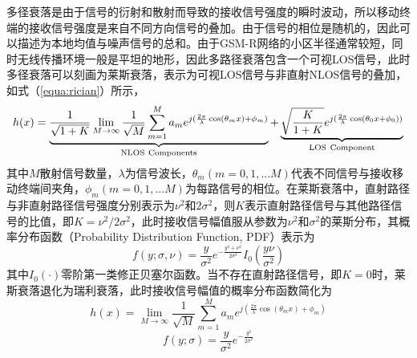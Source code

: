 多径衰落是由于信号的衍射和散射而导致的接收信号强度的瞬时波动，所以移动终端的接收信号强度是来自不同方向信号的叠加。由于信号的相位是随机的，因此可以描述为本地均值与噪声信号的总和。由于GSM-R网络的小区半径通常较短，同时无线传播环境一般是平坦的地形，因此多路径衰落包含一个可视LOS信号，此时多径衰落可以刻画为莱斯衰落，表示为可视LOS信号与非直射NLOS信号的叠加，如式（\ref{equa:rician}）所示，
\begin{equation}
  h(x)=\underbrace{\frac{1}{\sqrt{1+K}}\lim_{M \to \infty}\frac{1}{\sqrt M}\sum_{m=1}^{M}a_{m}e^{j(\frac{2\pi}{\lambda}\cos(\theta_{m}x)+\phi_m)}}_{\rm NLOS~Components}
  +\underbrace{\sqrt{\frac{K}{1+K}}e^{j(\frac{2\pi}{\lambda}\cos(\theta_{0}x+ \phi_0))}}_{\rm LOS~Component}
\label{equa:rician}
\end{equation}
其中$M$散射信号数量，$\lambda$为信号波长，$\theta_m(m=0,1,...M)$代表不同信号与接收移动终端间夹角，$\phi_m(m=0,1,...M)$为每路信号的相位。在莱斯衰落中，直射路径与非直射路径信号强度分别表示为$\nu^2$和$2\sigma^2$，则$K$表示直射路径信号与其他路径信号的比值，即$K=\nu^2/2\sigma^2$，此时接收信号幅值服从参数为$\nu^2$和$\sigma^2$的莱斯分布，其概率分布函数（Probability Distribution Function, PDF）表示为
\begin{equation}
    f(y;\sigma,\nu)=\frac{y}{\sigma^2}e^{-\frac{y^2+\nu^2}{2\sigma^2}}I_0\left(\frac{y\nu}{\sigma^2}\right)
\label{equa:ricianPDF}
\end{equation}
其中$I_0(\cdot)$零阶第一类修正贝塞尔函数。当不存在直射路径信号，即$K=0$时，莱斯衰落退化为瑞利衰落，此时接收信号幅值的概率分布函数简化为
\begin{equation}
    h(x)=\lim_{M \to \infty}\frac{1}{\sqrt M}\sum_{m=1}^{M}a_{m}e^{j\left(\frac{2\pi}{\lambda}\cos(\theta_{m}x)+\phi_m\right)}
\label{equa:rayleigh}
\end{equation}
\begin{equation}
    f(y;\sigma)=\frac{y}{\sigma^2}e^{-\frac{y^2}{2\sigma^2}}
\label{equa:rayleighPDF}
\end{equation}


